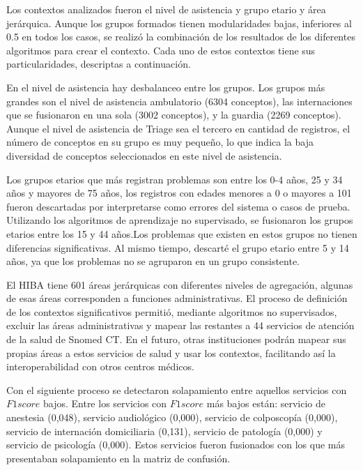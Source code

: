 Los contextos analizados fueron el  nivel de asistencia y grupo etario y área jerárquica. Aunque los grupos formados tienen modularidades bajas, inferiores al \num{0.5} en todos los casos, se realizó la combinación de los resultados de los diferentes algoritmos para crear el contexto.  Cada uno de estos contextos tiene sus particularidades, descriptas a continuación.

En el nivel de asistencia hay desbalanceo entre los grupos. Los grupos más grandes son el nivel de asistencia ambulatorio (\num{6304} conceptos), las internaciones que se fusionaron en una sola (\num{3002} conceptos), y la guardia (\num{2269} conceptos). Aunque el nivel de asistencia de Triage sea el tercero en cantidad de registros, el número de conceptos en su grupo es muy pequeño, lo que indica la baja diversidad de conceptos seleccionados en este nivel de asistencia. 

Los grupos etarios que más registran problemas son entre los 0-4 años, 25 y 34 años y mayores de 75 años, los registros con edades menores a 0 o mayores a 101 fueron descartadas por interpretarse como errores del sistema o casos de prueba. Utilizando los algoritmos de aprendizaje no supervisado, se fusionaron los grupos etarios entre los 15 y 44 años.Los problemas que existen en estos grupos no tienen diferencias significativas. Al mismo tiempo, descarté el grupo etario entre 5 y 14 años, ya que los problemas no se agruparon en un grupo consistente.

El \acrshort{HIBA} tiene 601 áreas jerárquicas con diferentes niveles de agregación, algunas de esas áreas corresponden a funciones administrativas. El proceso de definición de los contextos significativos permitió, mediante algoritmos no supervisados,  excluir las áreas administrativas y mapear las restantes a  44 servicios de atención de la salud de Snomed CT. En el futuro, otras instituciones podrán mapear sus propias áreas a estos servicios de salud y usar los contextos, facilitando así la interoperabilidad con otros centros médicos. 

Con el siguiente proceso se detectaron solapamiento entre aquellos servicios con $F1 score$ bajos. Entre los servicios con $F1 score$ más bajos están: servicio de anestesia (0,048), servicio audiológico (0,000), servicio de colposcopía (0,000), servicio de internación domiciliaria (0,131), servicio de patología (0,000) y servicio de psicología (0,000). Estos servicios fueron fusionados con los que más presentaban solapamiento en la matriz de confusión. 


